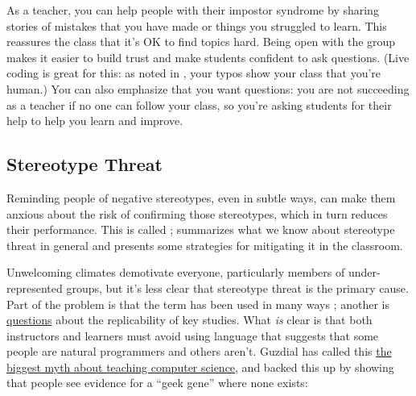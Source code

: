 As a teacher, you can help people with their impostor syndrome by
sharing stories of mistakes that you have made or things you struggled
to learn. This reassures the class that it's OK to find topics hard.
Being open with the group makes it easier to build trust and make
students confident to ask questions. (Live coding is great for this:
as noted in , your typos show your class
that you're human.)  You can also emphasize that you want questions:
you are not succeeding as a teacher if no one can follow your class,
so you're asking students for their help to help you learn and
improve.

\subsection*{Stereotype Threat}

Reminding people of negative stereotypes, even in subtle ways, can
make them anxious about the risk of confirming those stereotypes,
which in turn reduces their performance. This is called
; \cite{Stee2011}
summarizes what we know about stereotype threat in general and
presents some strategies for mitigating it in the classroom.

Unwelcoming climates demotivate everyone, particularly members of
under-represented groups, but it's less clear that stereotype threat
is the primary cause. Part of the problem is that the term has been
used in many ways \cite{Shap2007}; another is
\href{https://www.psychologytoday.com/blog/rabble-rouser/201512/is-stereotype-threat-overcooked-overstated-and-oversold}{questions}
about the replicability of key studies.  What \emph{is} clear is that
both instructors and learners must avoid using language that suggests
that some people are natural programmers and others aren't.  Guzdial
has called this
\href{http://cacm.acm.org/blogs/blog-cacm/189498-top-10-myths-about-teaching-computer-science/fulltext}{the
  biggest myth about teaching computer science}, and \cite{Pati2016}
backed this up by showing that people see evidence for a ``geek gene''
where none exists:

